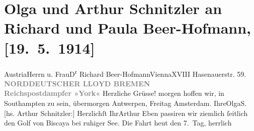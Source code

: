 

         
         \renewcommand{\erwaehntePersonen}{Personen: Richard Beer-Hofmann, Paula Beer-Hofmann}
         \renewcommand{\erwaehnteInstitutionen}{Institutionen: Norddeutscher Lloyd}
         \renewcommand{\erwaehnteOrte}{Orte: Amsterdam, Antwerpen, Biskaya, Hasenauerstraße, Southampton, Wien, Österreich}
         \renewcommand{\erwaehnteWerke}{}
               \section[Olga und Arthur Schnitzler an Richard und Paula Beer-Hofmann, {[}19. 5. 1914{]}]{ Olga und Arthur Schnitzler an Richard und Paula Beer-Hofmann,
               {[}19. 5. 1914{]}}\nopagebreak{}\rehead{ }\begin{ledgroupsized}[t]{13cm}\normalsize\beginnumbering \toendnotes[C]{\smallbreak\pagebreak[2]} 
\pstart{}{\pb}Austria\pend{}\pstart{}Herrn u. Frau\pend{}\pstart{}D\textsuperscript{r} Richard Beer-Hofmann\pend{}\pstart{}Vienna\pend{}\pstart{}XVIII Hasenauerstr. 59.\pend{}{\bigskip}\pstart
           \noindent{}\centering{}{\pb}\textcolor{gray}{\textbf{NORDDEUTSCHER LLOYD BREMEN}}{\\}\textcolor{gray}{\textbf{Reichspostdampfer »York«}}\pend
           \pstart
           \noindent{}{\pb}Herzliche Grüsse!\pend
           \pstart
           morgen hoffen wir, in Southampten zu sein,
               übermorgen Antwerpen, Freitag{ }Amsterdam.\pend
           \pstart Ihre\spacefill\mbox{OlgaS.}\pend{}\pstart
           {\pb}{[}hs. Arthur Schnitzler:{]} Herzlichſt Ihr\spacefill\mbox{Arthur}\pend
           \pstart
           Eben passiren wir ziemlich ſeitlich den Golf von
                  Biscaya bei ruhiger See.\pend
           \pstart
           Die Fahrt heut den 7. Tag, herrlich\pend
           

\end{ledgroupsized}
